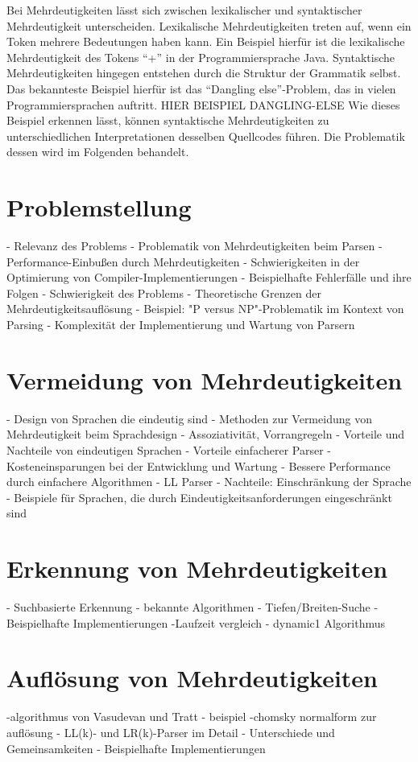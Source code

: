 \documentclass[runningheads]{llncs}
\begin{document}
Bei Mehrdeutigkeiten lässt sich zwischen lexikalischer und syntaktischer Mehrdeutigkeit unterscheiden.
Lexikalische Mehrdeutigkeiten treten auf, wenn ein Token mehrere Bedeutungen haben kann.
Ein Beispiel hierfür ist die lexikalische Mehrdeutigkeit des Tokens ``+'' in der Programmiersprache Java.
Syntaktische Mehrdeutigkeiten hingegen entstehen durch die Struktur der Grammatik selbst.
Das bekannteste Beispiel hierfür ist das ``Dangling else''-Problem, das in vielen Programmiersprachen auftritt.
HIER BEISPIEL DANGLING-ELSE
Wie dieses Beispiel erkennen lässt,
können syntaktische Mehrdeutigkeiten zu unterschiedlichen Interpretationen desselben Quellcodes führen.
Die Problematik dessen wird im Folgenden behandelt.


\section{Problemstellung}


- Relevanz des Problems
- Problematik von Mehrdeutigkeiten beim Parsen
- Performance-Einbußen durch Mehrdeutigkeiten
- Schwierigkeiten in der Optimierung von Compiler-Implementierungen
- Beispielhafte Fehlerfälle und ihre Folgen
- Schwierigkeit des Problems
- Theoretische Grenzen der Mehrdeutigkeitsauflösung
- Beispiel: "P versus NP"-Problematik im Kontext von Parsing
- Komplexität der Implementierung und Wartung von Parsern

\section{Vermeidung von Mehrdeutigkeiten}
- Design von Sprachen die eindeutig sind
- Methoden zur Vermeidung von Mehrdeutigkeit beim Sprachdesign
- Assoziativität, Vorrangregeln
- Vorteile und Nachteile von eindeutigen Sprachen
- Vorteile einfacherer Parser
- Kosteneinsparungen bei der Entwicklung und Wartung
- Bessere Performance durch einfachere Algorithmen
- LL Parser
- Nachteile: Einschränkung der Sprache
- Beispiele für Sprachen, die durch Eindeutigkeitsanforderungen eingeschränkt sind

\section{Erkennung von Mehrdeutigkeiten}
- Suchbasierte Erkennung
- bekannte Algorithmen
- Tiefen/Breiten-Suche
- Beispielhafte Implementierungen
-Laufzeit vergleich
- dynamic1 Algorithmus

\section{Auflösung von Mehrdeutigkeiten}
-algorithmus von Vasudevan und Tratt
- beispiel
-chomsky normalform zur auflösung
- LL(k)- und LR(k)-Parser im Detail
- Unterschiede und Gemeinsamkeiten
- Beispielhafte Implementierungen
\end{document}
